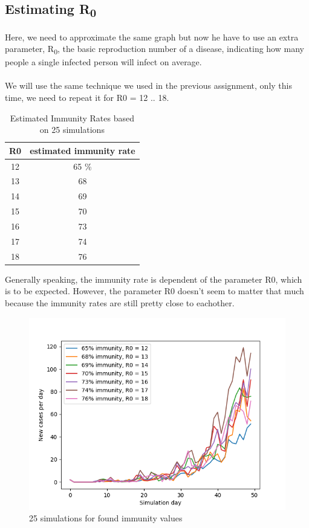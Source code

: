 \documentclass[runningheads]{llncs}
\begin{document}
	\subsection{Estimating R\textsubscript{0}}
	Here, we need to approximate the same graph but now he have to use an extra parameter, R\textsubscript{0}, the basic reproduction number of a disease, indicating how many people a single infected person will infect on average.
	\\
	\\
	\noindent
	We will use the same technique we used in the previous assignment, only this time, we need to repeat it for R0 = 12 .. 18.
	
	\begin{table}
		\begin{center}
			
			\begin{tabular}{c||c}
				R0 & estimated immunity rate \\ \hline
				12 & 65	\% \\
				13 & 68 \\
				14 & 69 \\
				15 & 70 \\
				16 & 73 \\
				17 & 74 \\
				18 & 76 \\
			\end{tabular}
			\caption{Estimated Immunity Rates based on 25 simulations}
		\end{center}
		
	\end{table}
	
	Generally speaking, the immunity rate is dependent of the parameter R0, which is to be expected. However, the parameter R0 doesn't seem to matter that much because the immunity rates are still pretty close to eachother.
	
	\begin{figure}
		\includegraphics[width=\textwidth]{test_R0_final.png}
		\caption{25 simulations for found immunity values} 
	\end{figure}
	
\end{document}
